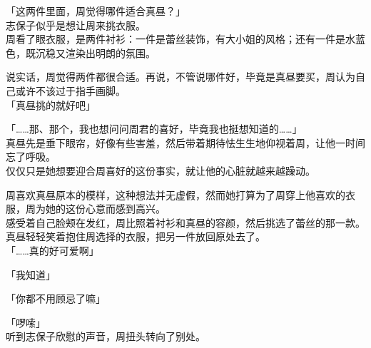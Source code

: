 「这两件里面，周觉得哪件适合真昼？」\\

志保子似乎是想让周来挑衣服。\\

周看了眼衣服，是两件衬衫：一件是蕾丝装饰，有大小姐的风格；还有一件是水蓝色，既沉稳又渲染出明朗的氛围。

说实话，周觉得两件都很合适。再说，不管说哪件好，毕竟是真昼要买，周认为自己或许不该过于指手画脚。\\

「真昼挑的就好吧」

「……那、那个，我也想问问周君的喜好，毕竟我也挺想知道的……」\\

真昼先是垂下眼帘，好像有些害羞，然后带着期待怯生生地仰视着周，让他一时间忘了呼吸。\\

仅仅只是她想要迎合周喜好的这份事实，就让他的心脏就越来越躁动。

周喜欢真昼原本的模样，这种想法并无虚假，然而她打算为了周穿上他喜欢的衣服，周为她的这份心意而感到高兴。\\

感受着自己脸颊在发红，周比照着衬衫和真昼的容颜，然后挑选了蕾丝的那一款。\\

真昼轻轻笑着抱住周选择的衣服，把另一件放回原处去了。\\

「……真的好可爱啊」

「我知道」

「你都不用顾忌了嘛」

「啰嗦」\\

听到志保子欣慰的声音，周扭头转向了别处。
